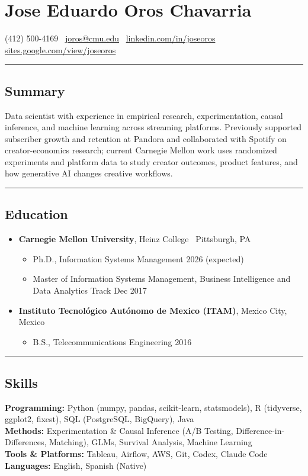 \documentclass[10pt,letterpaper]{article}
\newcommand{\name}[1]{\section*{#1}}
\newcommand{\sep}{{\color{gray}\,\textbullet\,\,}}
\newcommand{\hsep}{\noindent\textcolor{gray}{\rule{\textwidth}{0.5pt}}}
\newcommand{\block}[1]{\begin{samepage}\hsep\subsection*{#1}\end{samepage}}
\begin{document}
\name{Jose Eduardo Oros Chavarria}

\begin{center}
(412) 500-4169 \sep \href{mailto:joros@cmu.edu}{joros@cmu.edu} \sep \href{https://www.linkedin.com/in/joseoros}{linkedin.com/in/joseoros} \sep \href{https://sites.google.com/view/joseoros}{sites.google.com/view/joseoros}
\end{center}

\block{Summary}

\noindent Data scientist with experience in empirical research, experimentation, causal inference, and machine learning across streaming platforms. Previously supported subscriber growth and retention at Pandora and collaborated with Spotify on creator-economics research; current Carnegie Mellon work uses randomized experiments and platform data to study creator outcomes, product features, and how generative AI changes creative workflows.

\block{Education}

\begin{itemize}[leftmargin=0pt, label={}, itemsep=4pt]
\item \textbf{Carnegie Mellon University}, Heinz College \sep Pittsburgh, PA
  \begin{itemize}[label={}]
  \item Ph.D., Information Systems Management \hfill 2026 (expected)
  \item Master of Information Systems Management, Business Intelligence and Data Analytics Track \hfill Dec 2017
  \end{itemize}
\item \textbf{Instituto Tecnol\'ogico Aut\'onomo de Mexico (ITAM)}, Mexico City, Mexico
  \begin{itemize}[label={}]
  \item B.S., Telecommunications Engineering \hfill 2016
  \end{itemize}
\end{itemize}

\block{Skills}

\noindent\textbf{Programming:} Python (numpy, pandas, scikit-learn, statsmodels), R (tidyverse, ggplot2, fixest), SQL (PostgreSQL, BigQuery), Java \\
\textbf{Methods:} Experimentation \& Causal Inference (A/B Testing, Difference-in-Differences, Matching), GLMs, Survival Analysis, Machine Learning \\
\textbf{Tools \& Platforms:} Tableau, Airflow, AWS, Git, Codex, Claude Code \\
\textbf{Languages:} English, Spanish (Native)
\end{document}
